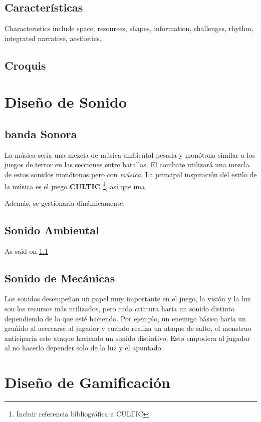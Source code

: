     \subsection{Características}
    Characteristics include space, resources, shapes, information, challenges, rhythm, integrated narrative, aesthetics.
    \subsection{Croquis}

\section{Diseño de Sonido}
    \subsection{banda Sonora} \label{ost}
        La música sería una mezcla de música ambiental pesada y monótona similar a los juegos de terror en las secciones entre batallas. El combate utilizará una mezcla de estos sonidos monótonos pero con \textit{música}.
        La principal inspiración del estilo de la música es el juego \textbf{CULTIC} \footnote{Incluir referencia bibliográfica a CULTIC}, así que una

        Además, se gestionaría dinámicamente,

    \subsection{Sonido Ambiental}
        As said on \ref{ost}
    \subsection{Sonido de Mecánicas}
        Los sonidos desempeñan un papel muy importante en el juego, la visión y la luz son los recursos más utilizados, pero cada criatura haría un sonido distinto dependiendo de lo que esté haciendo. Por ejemplo, un enemigo básico haría un gruñido al acercarse al jugador y cuando realiza un ataque de salto, el monstruo anticiparía este ataque haciendo un sonido distintivo. Esto empodera al jugador al no hacerlo depender solo de la luz y el apuntado.

\section{Diseño de Gamificación}

